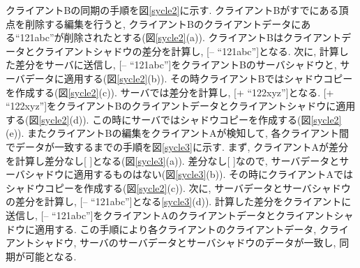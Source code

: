 クライアントBの同期の手順を図\ref{sycle2}に示す.
クライアントBがすでにある頂点を削除する編集を行うと, クライアントBのクライアントデータにある``121abc''が削除されたとする(図\ref{sycle2}(a)).
クライアントBはクライアントデータとクライアントシャドウの差分を計算し, [-- ``121abc'']となる. 次に, 計算した差分をサーバに送信し, [-- ``121abc'']をクライアントBのサーバシャドウと, サーバデータに適用する(図\ref{sycle2}(b)). その時クライアントBではシャドウコピーを作成する(図\ref{sycle2}(c)). サーバでは差分を計算し, [+ ``122xyz'']となる. [+ ``122xyz'']をクライアントBのクライアントデータとクライアントシャドウに適用する(図\ref{sycle2}(d)). この時にサーバではシャドウコピーを作成する(図\ref{sycle2}(e)).
またクライアントBの編集をクライアントAが検知して, 各クライアント間でデータが一致するまでの手順を図\ref{sycle3}に示す.
まず, クライアントAが差分を計算し差分なし[ ]となる(図\ref{sycle3}(a)).
差分なし[ ]なので, サーバデータとサーバシャドウに適用するものはない(図\ref{sycle3}(b)). その時にクライアントAではシャドウコピーを作成する(図\ref{sycle2}(c)).
次に, サーバデータとサーバシャドウの差分を計算し, [-- ``121abc'']となる\ref{sycle3}(d)). 計算した差分をクライアントに送信し, [-- ``121abc'']をクライアントAのクライアントデータとクライアントシャドウに適用する.
この手順により各クライアントのクライアントデータ, クライアントシャドウ, サーバのサーバデータとサーバシャドウのデータが一致し, 同期が可能となる.

